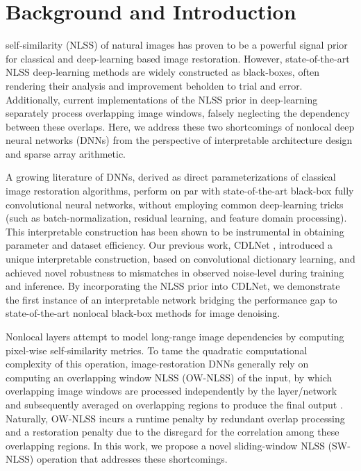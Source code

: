 \documentclass[lettersize,journal]{IEEEtran}
\newcommand{\soa}{state-of-the-art }
\begin{document}
\section{Background and Introduction}
 self-similarity (NLSS) of natural images has proven to
be a powerful signal prior for classical and deep-learning based image restoration.
However, \soa NLSS deep-learning methods are widely constructed as black-boxes, 
often rendering their analysis and improvement beholden to trial and error.
Additionally, current implementations of the NLSS prior in deep-learning separately process 
overlapping image windows, falsely neglecting the dependency between these
overlaps. Here, we address these two shortcomings of nonlocal deep
neural networks (DNNs) from the perspective of interpretable architecture design
and sparse array arithmetic.

A growing literature of DNNs, derived as direct parameterizations of classical
image restoration algorithms, perform on par with \soa black-box fully
convolutional neural networks, without employing common deep-learning tricks
(such as batch-normalization, residual learning, and feature domain processing).
This interpretable construction has been shown to be instrumental in obtaining
parameter and dataset efficiency\cite{janjusevicCDLNet2022, lecouat2020nonlocal, janjusevicGDLNet2022,
Simon2019, Scetbon2019DeepKD}. Our previous work, CDLNet
\cite{janjusevicCDLNet2022}, introduced a unique interpretable construction,
based on convolutional dictionary learning, and achieved novel robustness to
mismatches in observed noise-level during training and inference. By incorporating the NLSS prior into
CDLNet, we demonstrate the first instance of an interpretable network bridging
the performance gap to \soa nonlocal black-box methods for image denoising. 

Nonlocal layers attempt to model long-range image dependencies by computing
pixel-wise self-similarity metrics. To tame the quadratic computational
complexity of this operation, image-restoration DNNs generally rely on computing
an overlapping window NLSS (OW-NLSS) of the input, by which overlapping image windows are
processed independently by the layer/network and subsequently averaged on
overlapping regions to produce the final output \cite{lecouat2020nonlocal, liu2018non}.
Naturally, OW-NLSS incurs a runtime penalty by redundant overlap processing and
a restoration penalty due to the disregard for the correlation among
these overlapping regions. In this work, we propose a novel sliding-window NLSS
(SW-NLSS) operation that addresses these shortcomings.
\end{document}
